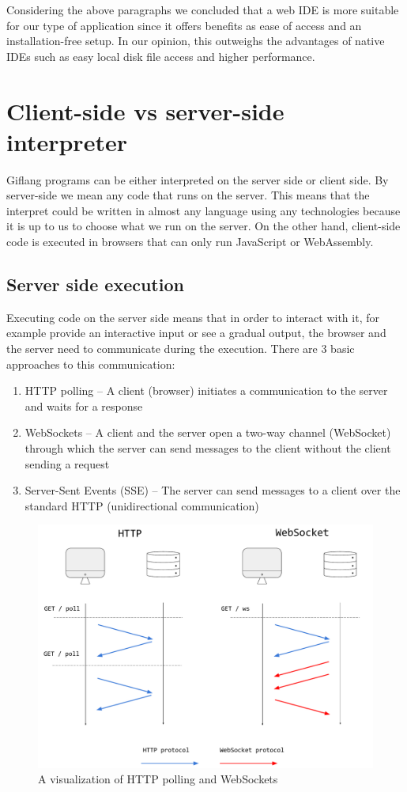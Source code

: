 Considering the above paragraphs we concluded that a web IDE is more suitable for our type of application since it offers benefits as
ease of access and an installation-free setup. In our opinion, this outweighs the advantages of native IDEs such as easy local disk
file access and higher performance.

\section{Client-side vs server-side interpreter}

Giflang programs can be either interpreted on the server side or client side. By server-side we mean any code that runs on the server. This means that
the interpret could be written in almost any language using any technologies because it is up to us to choose what we run on the server. On the other hand,
client-side code is executed in browsers that can only run JavaScript or WebAssembly.

\subsection{Server side execution}
Executing code on the server side means that in order to interact with it, for example provide an interactive input or see a gradual output, the browser and
the server need to communicate during the execution. There are $3$ basic approaches to this communication:
\begin{enumerate}
    \item HTTP polling -- A client (browser) initiates a communication to the server and waits for a response
    \item WebSockets -- A client and the server open a two-way channel (WebSocket) through which the server can send messages to the client without
    the client sending a request 
    \item Server-Sent Events (SSE) -- The server can send messages to a client over the standard HTTP (unidirectional communication)
\end{enumerate}

\begin{figure}[!hbt]
	\includegraphics[width=\textwidth]{../img/websockets}
	\caption{A visualization of HTTP polling and WebSockets}
	\label{fig:chap2:websockets}
\end{figure}

